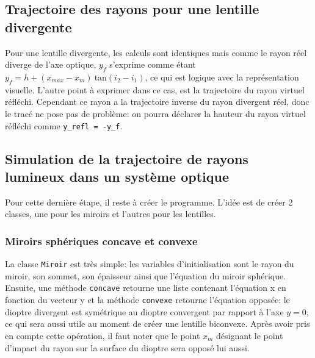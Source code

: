 \documentclass[a4paper, 11pt]{article}
\begin{document}
\subsection{Trajectoire des rayons pour une lentille divergente}
Pour une lentille divergente, les calculs sont identiques mais comme le rayon réel diverge de l'axe optique, $y_f$ s'exprime comme étant $y_f = h + (x_{max} - x_m) \: \text{tan} (i_2 - i_1)$, ce qui est logique avec la représentation visuelle. L'autre point à exprimer dans ce cas, est la trajectoire du rayon virtuel réfléchi. Cependant ce rayon a la trajectoire inverse du rayon divergent réel, donc le tracé ne pose pas de problème: on pourra déclarer la hauteur du rayon virtuel réfléchi comme \verb|y_refl = -y_f|.

\subsection{Simulation de la trajectoire de rayons lumineux dans un système optique}
Pour cette dernière étape, il reste à créer le programme. L'idée est de créer 2 classes, une pour les miroirs et l'autres pour les lentilles. 

\subsubsection{Miroirs sphériques concave et convexe}
La classe \verb|Miroir| est très simple: les variables d'initialisation sont le rayon du miroir, son sommet, son épaisseur ainsi que l'équation du miroir sphérique. Ensuite, une méthode \verb|concave| retourne une liste contenant l'équation x en fonction du vecteur y et la méthode \verb|convexe| retourne l'équation opposée: le dioptre divergent est symétrique au dioptre convergent par rapport à l'axe $y=0$, ce qui sera aussi utile au moment de créer une lentille biconvexe. Après avoir pris en compte cette opération, il faut noter que le point $x_m$ désignant le point d'impact du rayon sur la surface du dioptre sera opposé lui aussi.
\end{document}
